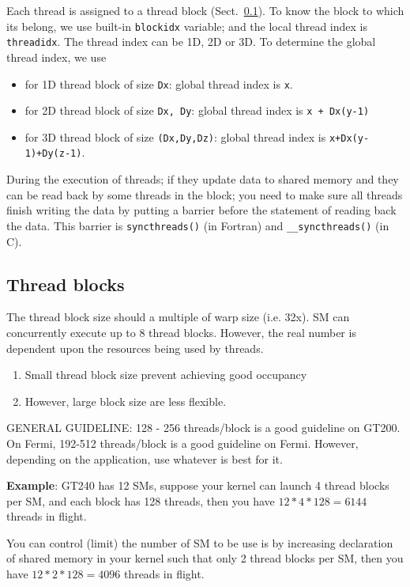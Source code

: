 Each thread is assigned to a thread block
(Sect.~\ref{sec:thread-blocks}). To know the block to which its
belong, we use built-in \verb!blockidx! variable; and the local thread
index is \verb!threadidx!. The thread index can be 1D, 2D or 3D. To
determine the global thread index, we use
\begin{itemize}
\item for 1D thread block of size \verb!Dx!: global thread index is
  \verb!x!.
\item for 2D thread block of size \verb!Dx, Dy!: global thread index
  is \verb!x + Dx(y-1)!
\item for 3D thread block of size \verb!(Dx,Dy,Dz)!: global thread
  index is \verb!x+Dx(y-1)+Dy(z-1)!. 
\end{itemize}

During the execution of threads; if they update data to shared memory
and they can be read back by some threads in the block; you need to
make sure all threads finish writing the data by putting a barrier
before the statement of reading back the data. This barrier is
\verb!syncthreads()! (in Fortran) and \verb!__syncthreads()! (in C). 



\subsection{Thread blocks}
\label{sec:thread-blocks}

The thread block size should a multiple of warp size (i.e. 32x). SM
can concurrently execute up to 8 thread blocks. However, the real
number is dependent upon the resources being used by threads.
\begin{enumerate}
\item Small thread block size prevent achieving good occupancy
\item However, large block size are less flexible.
\end{enumerate}

GENERAL GUIDELINE: 128 - 256 threads/block is a good guideline on
GT200.  On Fermi, 192-512 threads/block is a good guideline on
Fermi. However, depending on the application, use whatever is best for
it.


{\bf Example}: GT240 has 12 SMs, suppose your kernel can launch 4
thread blocks per SM, and each block has 128 threads, then you have
$12*4*128=6144$ threads in flight.

You can control (limit) the number of SM to be use is by increasing
declaration of shared memory in your kernel such that only 2 thread
blocks per SM, then you have $12*2*128=4096$ threads in flight.

